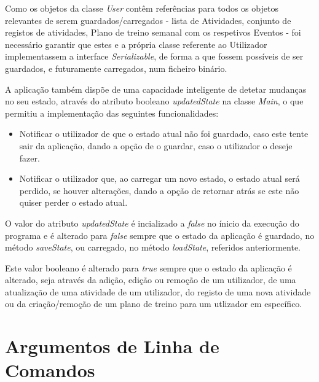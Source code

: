 \documentclass[a4paper,12pt]{scrreprt}
\begin{document}
Como os objetos da classe \textit{User} contêm referências para todos os objetos relevantes de serem guardados/carregados - lista de Atividades, conjunto de registos de atividades, Plano de treino semanal com os respetivos Eventos - foi necessário garantir que estes e a própria classe referente ao Utilizador implementassem a interface \textit{Serializable}, de forma a que fossem possíveis de ser guardados, e futuramente carregados, num ficheiro binário.

A aplicação também dispõe de uma capacidade inteligente de detetar mudanças no seu estado, através do atributo booleano \textit{updatedState} na classe \textit{Main}, o que permitiu a implementação das seguintes funcionalidades:

\begin{itemize}
    \item Notificar o utilizador de que o estado atual não foi guardado, caso este tente sair da aplicação, dando a opção de o guardar, caso o utilizador o deseje fazer.
    \item Notificar o utilizador que, ao carregar um novo estado, o estado atual será perdido, se houver alterações, dando a opção de retornar atrás se este não quiser perder o estado atual.
\end{itemize}

O valor do atributo \textit{updatedState} é incializado a \textit{false} no ínicio da execução do programa e é alterado para \textit{false} sempre que o estado da aplicação é guardado, no método \textit{saveState}, ou carregado, no método \textit{loadState}, referidos anteriormente.

Este valor booleano é alterado para \textit{true} sempre que o estado da aplicação é alterado, seja através da adição, edição ou remoção de um utilizador, de uma atualização de uma atividade de um utilizador, do registo de uma nova atividade ou da criação/remoção de um plano de treino para um utlizador em específico.

\clearpage
\section{Argumentos de Linha de Comandos}


\end{document}
